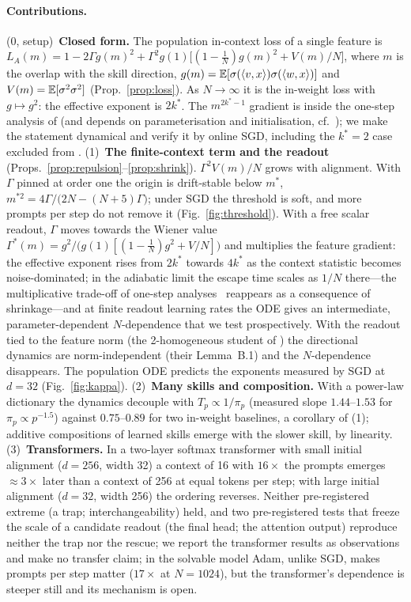 \paragraph{Contributions.}
(0, setup)~\textbf{Closed form.} The population in-context loss of a single feature is
$L_A(m)=1-2\Gamma g(m)^2+\Gamma^2 g(1)\big[(1-\tfrac1N)g(m)^2+V(m)/N\big]$, where $m$ is the overlap with the skill direction,
$g(m)=\mathbb{E}[\sigma(\langle v,x\rangle)\sigma(\langle w,x\rangle)]$ and $V(m)=\mathbb{E}[\sigma^2\sigma^2]$ (Prop.~\ref{prop:loss}). As $N\to\infty$ it is the in-weight loss with
$g\mapsto g^2$: the effective exponent is $2k^*$. The $m^{2k^*-1}$ gradient is inside the one-step analysis of
\citet[Lemma~21]{oko2024pretrained} (and depends on parameterisation and initialisation, cf.\ \citet{nishikawa2025nonlinear}); we make
the statement dynamical and verify it by online SGD, including the $k^*=2$ case excluded from \citet{ren2025emergence}.
(1)~\textbf{The finite-context term and the readout} (Props.~\ref{prop:repulsion}--\ref{prop:shrink}). $\Gamma^2V(m)/N$ grows with
alignment. With $\Gamma$ pinned at order one the origin is drift-stable below $m^*$, $m^{*2}=4\Gamma/\big(2N-(N+5)\Gamma\big)$;
under SGD the threshold is soft, and more prompts per step do not remove it (Fig.~\ref{fig:threshold}). With a free scalar
readout, $\Gamma$ moves towards the Wiener value $\Gamma^*(m)=g^2/\big(g(1)[(1-\tfrac1N)g^2+V/N]\big)$ and multiplies the feature gradient:
the effective exponent rises from $2k^*$ towards $4k^*$ as the context statistic becomes noise-dominated; in the adiabatic limit the
escape time scales as $1/N$ there---the multiplicative trade-off of one-step analyses~\citep[Remark~3]{oko2024pretrained} reappears
as a consequence of shrinkage---and at finite readout learning rates the ODE gives an intermediate, parameter-dependent $N$-dependence
that we test prospectively. With the readout tied to the feature norm (the 2-homogeneous student of \citet{ren2025emergence}) the
directional dynamics are norm-independent (their Lemma~B.1) and the $N$-dependence disappears. The population ODE predicts the
exponents measured by SGD at $d=32$ (Fig.~\ref{fig:kappa}).
(2)~\textbf{Many skills and composition.} With a power-law dictionary the dynamics decouple with $T_p\propto1/\pi_p$ (measured slope
$1.44$--$1.53$ for $\pi_p\propto p^{-1.5}$) against $0.75$--$0.89$ for two in-weight baselines, a corollary of (1); additive compositions of
learned skills emerge with the slower skill, by linearity.
(3)~\textbf{Transformers.} In a two-layer softmax transformer with small initial alignment ($d=256$, width 32) a context of 16
with $16\times$ the prompts emerges $\approx3\times$ later than a context of 256 at equal tokens per step; with large initial alignment
($d=32$, width 256) the ordering reverses. Neither pre-registered extreme (a trap; interchangeability) held, and two pre-registered tests that freeze the scale of a candidate readout (the final head; the attention output) reproduce neither the trap nor the rescue; we report the transformer results as observations and make no transfer claim; in the solvable model Adam, unlike SGD, makes prompts per step matter ($17\times$ at $N=1024$), but the transformer's dependence is steeper still and its mechanism is open.

